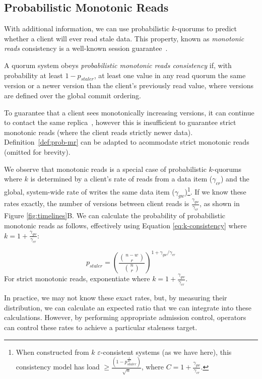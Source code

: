 \documentclass{vldb}
\begin{document}
\subsection{Probabilistic Monotonic Reads}

With additional information, we can use probabilistic $k$-quorums to
predict whether a client will ever read stale data.  This property,
known as \textit{monotonic reads} consistency is a well-known session
guarantee~\cite{sessionguarantees}.

\begin{definition}
\label{def:prob-mr}
A quorum system obeys \textit{probabilistic monotonic reads consistency} if, with probability at least $1-p_{staler}$, at
least one value in any read quorum the same version or a newer version
than the client's previously read value, where versions are defined
over the global commit ordering.
\end{definition}

To guarantee that a client sees monotonically increasing versions, it
can continue to contact the same replica~\cite{vogels-defs}, however
this is insufficient to guarantee strict monotonic reads (where the
client reads strictly newer data).  Definition~\ref{def:prob-mr} can
be adapted to acommodate strict monotonic reads (omitted for brevity).

We observe that monotonic reads is a special case of probabilistic
$k$-quorums where $k$ is determined by a client's rate of reads from a
data item ($\gamma_{cr}$) and the global, system-wide rate of writes
the same data item ($\gamma_{gw}$)\footnote{When constructed from $k$
  $\varepsilon$-consistent systems (as we have here), this consistency
  model has load $\geq
  \frac{(1-p_{staler}^{\frac{1}{2C}})}{\sqrt{n}}$, where
  $C=1+\frac{\gamma_{gw}}{\gamma_{cr}}$.}.  If we know these rates
exactly, the number of versions between client reads is
$\frac{\gamma_{gw}}{\gamma_{cr}}$, as shown in Figure
\ref{fig:timelines}B.  We can calculate the probability of
probabilistic monotonic reads as follows, effectively using Equation
\ref{eq:k-consistency} where $k=1+\frac{\gamma_{gw}}{\gamma_{cr}}$:

\begin{equation}
\label{eq:prob-mr}
p_{staler} = \left(\frac{{n-w \choose r}}{{n \choose r}}\right)^{1+\gamma_{gw}/\gamma_{cr}}
\end{equation}
For strict monotonic reads, exponentiate where $k=1+\frac{\gamma_{gw}}{\gamma_{cr}}$.

In practice, we may not know these exact rates, but, by measuring
their distribution, we can calculate an expected ratio that we can
integrate into these calculations.  However, by performing appropriate
admission control, operators can control these rates to achieve a
particular staleness target.
\end{document}
